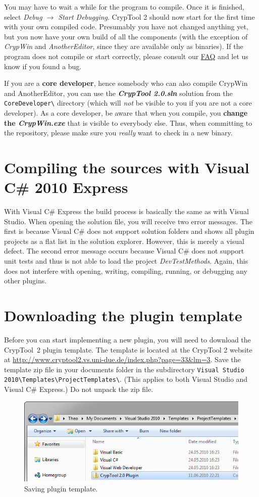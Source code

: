 You may have to wait a while for the program to compile. Once it is finished, select \textit{Debug $\rightarrow$ Start Debugging}. CrypTool 2 should now start for the first time with your own compiled code. Presumably you have not changed anything yet, but you now have your own build of all the components (with the exception of \textit{CrypWin} and \textit{AnotherEditor}, since they are available only as binaries). If the program does not compile or start correctly, please consult our \href{https://www.cryptool.org/trac/CrypTool2/wiki/FAQ}{FAQ} and let us know if you found a bug.

If you are a \textbf{core developer}, hence somebody who can also compile CrypWin and AnotherEditor, you can use the \textbf{\textit{CrypTool 2.0.sln}} solution from the \texttt{CoreDeveloper\textbackslash} directory (which will \textit{not} be visible to you if you are not a core developer). As a core developer, be aware that when you compile, you \textbf{change the \textit{CrypWin.exe}} that is visible to everybody else. Thus, when committing to the repository, please make sure you \textit{really} want to check in a new binary.

\section{Compiling the sources with Visual C\# 2010 Express}
\label{CompilingTheSourcesExpress}

With Visual C\# Express the build process is basically the same as with Visual Studio. When opening the solution file, you will receive two error messages. The first is because Visual C\# does not support solution folders and shows all plugin projects as a flat list in the solution explorer. However, this is merely a visual defect. The second error message occurs because Visual C\# does not support unit tests and thus is not able to load the project \textit{DevTestMethods}. Again, this does not interfere with opening, writing, compiling, running, or debugging any other plugins.

\section{Downloading the plugin template}
\label{DownloadingThePluginTemplate}

Before you can start implementing a new plugin, you will need to download the CrypTool~2 plugin template. The template is located at the CrypTool 2 website at \url{http://www.cryptool2.vs.uni-due.de/index.php?page=33&lm=3}. Save the template zip file in your documents folder in the subdirectory \texttt{Visual Studio 2010\textbackslash{}Templates\textbackslash{}ProjectTemplates\textbackslash{}}. (This applies to both Visual Studio and Visual C\# Express.) Do not unpack the zip file.

\begin{figure}[htbp]
	\centering
		\includegraphics{figures/vs_template.png}
	\caption{Saving plugin template.}
	\label{fig:vs_template}
\end{figure}
\clearpage
